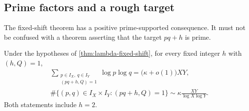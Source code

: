 \subsection{Prime factors and a rough target}
\label{subsec:lambda-prime-factor-corollary}

The fixed-shift theorem has a positive prime-supported consequence.  It must
not be confused with a theorem asserting that the target $pq+h$ is prime.

\begin{corollary}
\label{cor:prime-prime-rough-target}
Under the hypotheses of \cref{thm:lambda-fixed-shift}, for every fixed
integer $h$ with $(h,Q)=1$,
\begin{align}
 &\sum_{\substack{p\in I_X,\ q\in I_Y\\(pq+h,Q)=1}}
   \log p\log q
 =\bigl(\kappa+o(1)\bigr)XY,
 \label{eq:prime-prime-rough-target-weighted}\\
 &\#\{(p,q)\in I_X\times I_Y:(pq+h,Q)=1\}
 \sim\kappa\frac{XY}{\log X\log Y}.
 \label{eq:prime-prime-rough-target-count}
\end{align}
Both statements include $h=2$.
\end{corollary}


